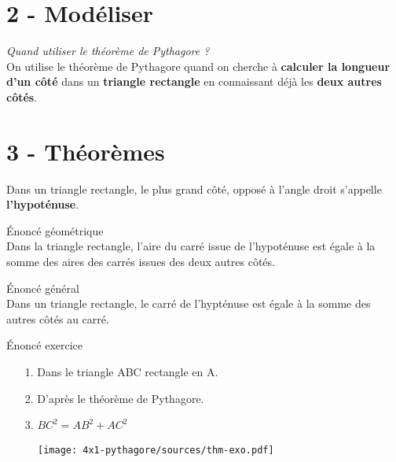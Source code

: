 \documentclass[11pt]{article}
\begin{document}
\section*{2 - Modéliser}

\textit{Quand utiliser le théorème de Pythagore ?}\\

On utilise le théorème de Pythagore quand on cherche à \textbf{calculer la longueur d'un côté} dans un \textbf{triangle rectangle} en connaissant déjà les \textbf{deux autres côtés}.



\section*{3 - Théorèmes}

\begin{Definition}
Dans un triangle rectangle, le plus grand côté, opposé à l'angle droit s'appelle \textbf{l'hypoténuse}.
\end{Definition}



\begin{Theorem}{Énoncé géométrique}\\
Dans la triangle rectangle, l'aire du carré issue de l'hypoténuse est égale à la somme des aires des carrés issues des deux autres côtés.
\end{Theorem}

\begin{Theorem}{Énoncé général}\\
Dans un triangle rectangle, le carré de l'hypténuse est égale à la somme des autres côtés au carré.
\end{Theorem}

\begin{Theorem}{Énoncé exercice}\\
    \begin{enumerate}
        \item[1.] Dans le triangle ABC rectangle en A.
        \item[2.] D'après le théorème de Pythagore.
        \item[3.] $BC^2 = AB^2 + AC^2$
    \end{enumerate}
    
    \begin{figure}[H]
        \centering
        \texttt{[image: 4x1-pythagore/sources/thm-exo.pdf]}
    \end{figure}
\end{Theorem}
\end{document}
